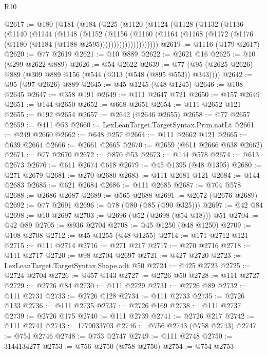 \begin{lexlean}{R10}
\begin{coremodule}
{{{{{{{{{{{{{{{{{{{{{{{{{{{{{{{{{{{{{{{{{{{{{{{{{{{{{{{{{{{{{{{{{{{{{{{{{{{{{{{{{{{{{{{{{{{{{{{{{{{{{{{{{{{{@2617 := @180
    (@181
      (@184
        (@225
          (@1120
            (@1124
              (@1128
                (@1132
                  (@1136
                    (@1140
                      (@1144
                        (@1148
                          (@1152
                            (@1156
                              (@1160
                                (@1164
                                  (@1168
                                    (@1172 (@1176 (@1180 (@1184 (@1188 @2595)))))))))))))))))))))
@2619 := @1116 (@179 @2617)
@2620 := @77 @2619
@2621 := @10 @889
@2622 := @2621 @16
@2625 := @10 (@299 @2622 @889)
@2626 := @54 @2622
@2639 := @77 (@95 (@2625 @2626) @889 (@309 @889 @156 (@544 (@313 (@548 (@895 @553)) @343))))
@2642 := @95 (@97 @2626) @889
@2645 := @45 @1245 (@48 @1245)
@2646 := @108 @2645
@2647 := @358 @191
@2649 := @111 @2647 @721
@2650 := @157 @2649
@2651 := @144 @2650
@2652 := @668 @2651
@2654 := @111 @2652 @121
@2655 := @192 @2654
@2657 := @2642 (@2646 @2655)
@2658 := @77 @2657
@2659 := @411 @53
@2660 := LexLeanTarget.TargetSyntax.Prim.natLt
@2661 := @249 @2660
@2662 := @648 @257
@2664 := @111 @2662 @121
@2665 := @639 @2664
@2666 := @2661 @2665
@2670 := @2659 (@611 @2666 @638 @2662)
@2671 := @77 @2670
@2672 := @870 @53
@2673 := @144 @578
@2674 := @613 @2673
@2676 := @611 @2674 @618
@2679 := @45 @1395 (@48 @1395)
@2680 := @271 @2679
@2681 := @270 @2680
@2683 := @111 @2681 @121
@2684 := @144 @2683
@2685 := @621 @2684
@2686 := @111 @2685
@2687 := @704 @578
@2688 := @2686 @2687
@2689 := @565 @2688
@2691 := @2672 (@2676 @2689)
@2692 := @77 @2691
@2696 := @78 (@80 (@85 (@90 @325)))
@2697 := @42 @84
@2698 := @10 @2697
@2703 := @2696 (@52 (@2698 (@54 @18))) @51
@2704 := @42 @89
@2705 := @936 @2704
@2708 := @45 @1250 (@48 @1250)
@2709 := @108 @2708
@2712 := @45 @1255 (@48 @1255)
@2714 := @171 @2712 @121
@2715 := @111 @2714
@2716 := @271 @217
@2717 := @270 @2716
@2718 := @111 @2717
@2720 := @98 @2704 @2697
@2721 := @427 @2720
@2723 := LexLeanTarget.TargetSyntax.Shape.adt @50
@2724 := @425 @2723
@2725 := @2724 @2704
@2726 := @457 @143
@2727 := @2726 @50
@2728 := @111 @2727
@2729 := @2726 @84
@2730 := @111 @2729
@2731 := @2726 @89
@2732 := @111 @2731
@2733 := @2726 @128
@2734 := @111 @2733
@2735 := @2726 @133
@2736 := @111 @2735
@2737 := @2726 @169
@2738 := @111 @2737
@2739 := @2726 @175
@2740 := @111 @2739
@2741 := @2726 @217
@2742 := @111 @2741
@2743 := 1779033703
@2746 := @756 @2743 (@758 @2743)
@2747 := @754 @2746
@2748 := @753 @2747
@2749 := @111 @2748
@2750 := 3144134277
@2753 := @756 @2750 (@758 @2750)
@2754 := @754 @2753
}}}}}}}}}}}}}}}}}}}}}}}}}}}}}}}}}}}}}}}}}}}}}}}}}}}}}}}}}}}}}}}}}}}}}}}}}}}}}}}}}}}}}}}}}}}}}}}}}}}}}}}}}}}}
\end{coremodule}
\end{lexlean}
